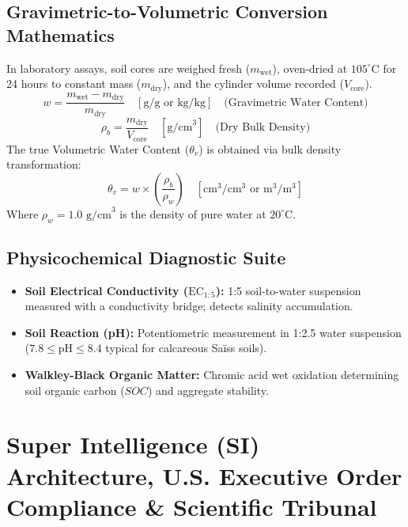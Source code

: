 \documentclass[11pt,a4paper,oneside]{report}
\begin{document}
\section{Gravimetric-to-Volumetric Conversion Mathematics}
In laboratory assays, soil cores are weighed fresh ($m_{\text{wet}}$), oven-dried at $105^\circ\text{C}$ for 24 hours to constant mass ($m_{\text{dry}}$), and the cylinder volume recorded ($V_{\text{core}}$).
\begin{equation}
w = \frac{m_{\text{wet}} - m_{\text{dry}}}{m_{\text{dry}}} \quad [\text{g/g or kg/kg}] \quad \text{(Gravimetric Water Content)}
\end{equation}
\begin{equation}
\rho_b = \frac{m_{\text{dry}}}{V_{\text{core}}} \quad [\text{g/cm}^3] \quad \text{(Dry Bulk Density)}
\end{equation}
The true Volumetric Water Content ($\theta_v$) is obtained via bulk density transformation:
\begin{equation}
\theta_v = w \times \left( \frac{\rho_b}{\rho_w} \right) \quad [\text{cm}^3/\text{cm}^3 \text{ or } \text{m}^3/\text{m}^3]
\end{equation}
Where $\rho_w = 1.0\text{ g/cm}^3$ is the density of pure water at $20^\circ\text{C}$.

\section{Physicochemical Diagnostic Suite}
\begin{itemize}[leftmargin=*]
    \item \textbf{Soil Electrical Conductivity ($\text{EC}_{1:5}$):} 1:5 soil-to-water suspension measured with a conductivity bridge; detects salinity accumulation.
    \item \textbf{Soil Reaction (pH):} Potentiometric measurement in 1:2.5 water suspension ($7.8 \le \text{pH} \le 8.4$ typical for calcareous Saïss soils).
    \item \textbf{Walkley-Black Organic Matter:} Chromic acid wet oxidation determining soil organic carbon ($SOC$) and aggregate stability.
\end{itemize}

\chapter{Super Intelligence (SI) Architecture, U.S. Executive Order Compliance \& Scientific Tribunal}
\end{document}
